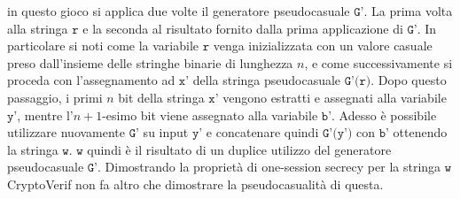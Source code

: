 \documentclass[a4paper,openright,twoside,12pt]{report}
\begin{document}
in questo gioco si applica due volte il generatore pseudocasuale $\texttt{G'}$. La prima volta alla stringa $\texttt{r}$ e la seconda al risultato fornito dalla prima applicazione di $\texttt{G'}$.
In particolare si noti come la variabile $\texttt{r}$ venga inizializzata con un valore casuale preso dall'insieme delle stringhe binarie di lunghezza $n$, e come
successivamente si proceda con l'assegnamento ad $\texttt{x'}$ della stringa pseudocasuale
$\texttt{G'(r)}$. Dopo questo passaggio, i primi $n$ bit della stringa $\texttt{x'}$ vengono estratti e assegnati alla variabile $\texttt{y'}$, mentre l'$n+1$-esimo bit viene assegnato alla variabile 
$\texttt{b'}$. Adesso \`e possibile utilizzare nuovamente $\texttt{G'}$ su input $\texttt{y'}$ e concatenare quindi $\texttt{G'(y')}$ con $\texttt{b'}$ ottenendo la stringa $\texttt{w}$.
$\texttt{w}$ quindi \`e il risultato di un duplice utilizzo del generatore pseudocasuale $\texttt{G'}$. Dimostrando la propriet\`a di one-session secrecy per la stringa $\texttt{w}$ CryptoVerif
non fa altro che dimostrare la pseudocasualit\`a di questa.
\newpage
\end{document}
